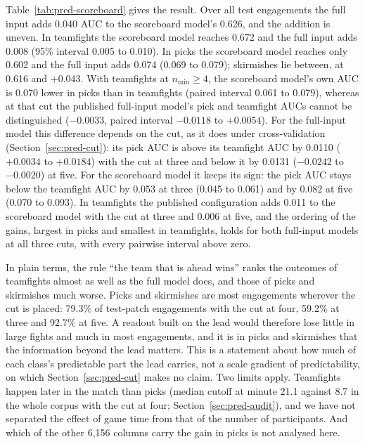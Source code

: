 Table~\ref{tab:pred-scoreboard} gives the result. Over all test engagements the full input adds 0.040 AUC
to the scoreboard model's 0.626, and the addition is uneven. In teamfights the scoreboard model reaches
0.672 and the full input adds 0.008 (95\% interval 0.005 to 0.010). In picks the scoreboard model reaches
only 0.602 and the full input adds 0.074 (0.069 to 0.079); skirmishes lie between, at 0.616 and $+0.043$.
With teamfights at $n_{\min} \ge 4$, the scoreboard model's own AUC is 0.070 lower in picks than in
teamfights (paired interval 0.061 to 0.079), whereas at that cut the published full-input model's pick and
teamfight AUCs cannot be distinguished ($-0.0033$, paired interval $-0.0118$ to $+0.0054$).
For the full-input model this difference depends on the cut, as it does under cross-validation (Section~\ref{sec:pred-cut}): its pick
AUC is above its teamfight AUC by 0.0110 ($+0.0034$ to $+0.0184$) with the cut at three and below it by
0.0131 ($-0.0242$ to $-0.0020$) at five. For the scoreboard model it keeps its sign: the pick AUC stays
below the teamfight AUC by 0.053 at three (0.045 to 0.061) and by 0.082 at five (0.070 to 0.093). In
teamfights the published configuration adds 0.011 to the scoreboard model with the cut at three and 0.006
at five, and the ordering of the gains, largest in picks and smallest in teamfights, holds for both
full-input models at all three cuts, with every pairwise interval above zero.

In plain terms, the rule ``the team that is ahead wins'' ranks the outcomes of teamfights almost as well
as the full model does, and those of picks and skirmishes much worse. Picks and skirmishes are most
engagements wherever the cut is placed: 79.3\% of test-patch engagements with the cut at four, 59.2\% at
three and 92.7\% at five. A readout built on the lead would therefore lose little in large fights and much
in most engagements, and it is in picks and skirmishes that the information beyond the lead matters. This
is a statement about how much of each class's predictable part the lead carries, not a scale gradient of
predictability, on which Section~\ref{sec:pred-cut} makes no claim. Two limits apply. Teamfights happen
later in the match than picks (median cutoff at minute 21.1 against 8.7 in the whole corpus with the cut
at four; Section~\ref{sec:pred-audit}), and we have not separated the effect of game time from that of
the number of participants. And which of the other 6,156 columns carry the gain in picks is not analysed
here.


